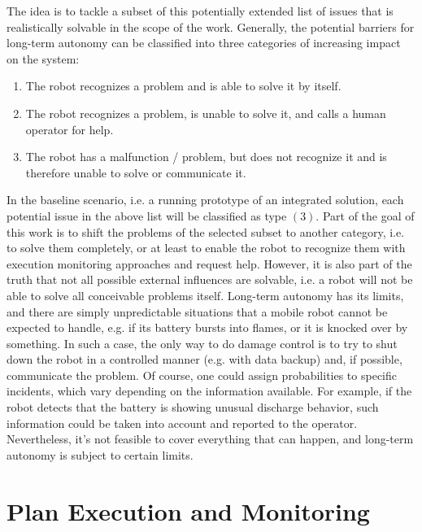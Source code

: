 \documentclass[english, master, utf8]{base/thesis_KBS}
\begin{document}
The idea is to tackle a subset of this potentially extended list of issues that is realistically solvable in the scope of the work.
Generally, the potential barriers for long-term autonomy can be classified into three categories of increasing impact on the system:
\begin{enumerate}
    \item The robot recognizes a problem and is able to solve it by itself.
    \item The robot recognizes a problem, is unable to solve it, and calls a human operator for help.
    \item The robot has a malfunction / problem, but does not recognize it and is therefore unable to solve or communicate it.
\end{enumerate}
In the baseline scenario, i.e. a running prototype of an integrated solution, each potential issue in the above list will be classified as type $(3)$.
Part of the goal of this work is to shift the problems of the selected subset to another category, i.e. to solve them completely, 
or at least to enable the robot to recognize them with execution monitoring approaches and request help.
However, it is also part of the truth that not all possible external influences are solvable, i.e. a robot will not be able to solve all
conceivable problems itself. Long-term autonomy has its limits, and there are simply unpredictable situations that a mobile robot cannot be expected to handle,
e.g. if its battery bursts into flames, or it is knocked over by something. In such a case, the only way to do damage control is to try to shut down the 
robot in a controlled manner (e.g. with data backup) and, if possible, communicate the problem.
Of course, one could assign probabilities to specific incidents, which vary depending on the information available. 
For example, if the robot detects that the battery is showing unusual discharge behavior, such information could be taken into account and 
reported to the operator. Nevertheless, it's not feasible to cover everything that can happen, and long-term autonomy is subject to certain limits.

\chapter{Plan Execution and Monitoring}
\end{document}
